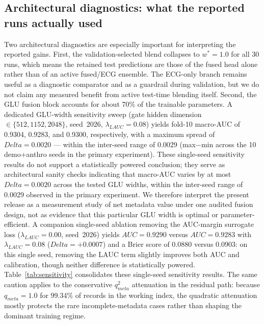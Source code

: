 \documentclass[mathematics,article,submit,pdftex]{Definitions/mdpi}
\def\texttt#1{#1}%
\def\mathrm#1{#1}%
\def\Delta{Delta }%
\begin{document}
\subsection{Architectural diagnostics: what the reported runs actually used}
Two architectural diagnostics are especially important for interpreting the reported gains. First, the validation-selected blend collapses to $w^{\ast}{=}1.0$ for all 30 runs, which means the retained test predictions are those of the fused head alone rather than of an active fused/ECG ensemble. The ECG-only branch remains useful as a diagnostic comparator and as a guardrail during validation, but we do not claim any measured benefit from active test-time blending itself. Second, the GLU fusion block accounts for about 70\% of the trainable parameters. A dedicated GLU-width sensitivity sweep (gate hidden dimension $\in \{512, 1152, 2048\}$, seed~2026, $\lambda_{\mathrm{LAUC}}{=}0.08$) yields fold-10 macro-AUC of 0.9304, 0.9283, and 0.9300, respectively, with a maximum spread of $\Delta{=}0.0020$ — within the inter-seed range of 0.0029 (max$-$min across the 10 \texttt{demo+anthro} seeds in the primary experiment). These single-seed sensitivity results do not support a statistically powered conclusion; they serve as architectural sanity checks indicating that macro-AUC varies by at most $\Delta{=}0.0020$ across the tested GLU widths, within the inter-seed range of 0.0029 observed in the primary experiment. We therefore interpret the present release as a measurement study of net metadata value under one audited fusion design, not as evidence that this particular GLU width is optimal or parameter-efficient. A companion single-seed ablation removing the AUC-margin surrogate loss ($\lambda_{\mathrm{LAUC}}{=}0.00$, seed~2026) yields $\mathrm{AUC}{=}0.9290$ versus $\mathrm{AUC}{=}0.9283$ with $\lambda_{\mathrm{LAUC}}{=}0.08$ ($\Delta{=}+0.0007$) and a Brier score of $0.0880$ versus $0.0903$: on this single seed, removing the LAUC term slightly improves both AUC and calibration, though neither difference is statistically powered. Table~\ref{tab:sensitivity} consolidates these single-seed sensitivity results. The same caution applies to the conservative $q_{\mathrm{meta}}^2$ attenuation in the residual path: because $q_{\mathrm{meta}}{=}1.0$ for 99.34\% of records in the working index, the quadratic attenuation mostly protects the rare incomplete-metadata cases rather than shaping the dominant training regime.
\end{document}
